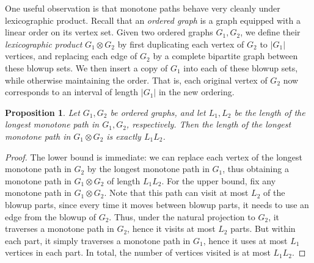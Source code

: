 \documentclass[11pt,reqno]{amsart}
\newtheorem{proposition}[theorem]{Proposition}
\theoremstyle{definition}
\newcommand\ab[1]{\lvert#1\rvert}
\newcommand\1{\mathbf{1}}
\begin{document}
One useful observation is that monotone paths behave very cleanly under lexicographic product. Recall that an \emph{ordered graph} is a graph equipped with a linear order on its vertex set. Given two ordered graphs $G_1,G_2$, we define their \emph{lexicographic product} $G_1 \otimes G_2$ by first duplicating each vertex of $G_2$ to $\ab{G_1}$ vertices, and replacing each edge of $G_2$ by a complete bipartite graph between these blowup sets. We then insert a copy of $G_1$ into each of these blowup sets, while otherwise maintaining the order. That is, each original vertex of $G_2$ now corresponds to an interval of length $\ab{G_1}$ in the new ordering. 
\begin{proposition}\label{prop:monotone path product}
    Let $G_1,G_2$ be ordered graphs, and let $L_1,L_2$ be the length of the longest monotone path in $G_1,G_2$, respectively. Then the length of the longest monotone path in $G_1 \otimes G_2$ is exactly $L_1L_2$.
\end{proposition}
\begin{proof}
    The lower bound is immediate: we can replace each vertex of the longest monotone path in $G_2$ by the longest monotone path in $G_1$, thus obtaining a monotone path in $G_1 \otimes G_2$ of length $L_1 L_2$. For the upper bound, fix any monotone path in $G_1 \otimes G_2$. Note that this path can visit at most $L_2$ of the blowup parts, since every time it moves between blowup parts, it needs to use an edge from the blowup of $G_2$. Thus, under the natural projection to $G_2$, it traverses a monotone path in $G_2$, hence it visits at most $L_2$ parts. But within each part, it simply traverses a monotone path in $G_1$, hence it uses at most $L_1$ vertices in each part. In total, the number of vertices visited is at most $L_1L_2$. 
\end{proof}
\end{document}
